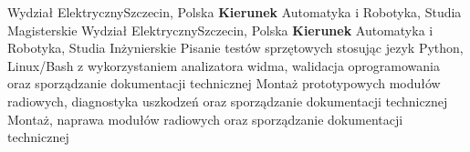 \documentclass[
    10pt,
    A4,
    polish,
    draft = false,
    twoside = false,
]{article}
\begin{document}
	{Wydział Elektryczny}{Szczecin, Polska}
	{\textbf{Kierunek} Automatyka i Robotyka, Studia Magisterskie}
	{Wydział Elektryczny}{Szczecin, Polska}
	{\textbf{Kierunek} Automatyka i Robotyka, Studia Inżynierskie}
	{Pisanie testów sprzętowych stosując jezyk Python, Linux/Bash z wykorzystaniem analizatora widma, walidacja oprogramowania oraz sporządzanie dokumentacji technicznej}	
	{Montaż prototypowych modułów radiowych, diagnostyka uszkodzeń oraz sporządzanie dokumentacji technicznej} 
	{Montaż, naprawa modułów radiowych oraz sporządzanie dokumentacji technicznej}
\end{document}
